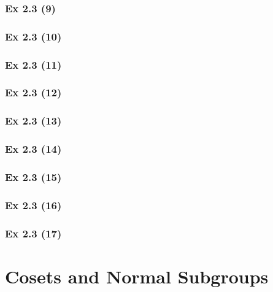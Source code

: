 \subsubsection{Ex 2.3 (9)}\label{sec:Ex_2.3.9}

\subsubsection{Ex 2.3 (10)}\label{sec:Ex_2.3.10}

\newpage		%

\subsubsection{Ex 2.3 (11)}\label{sec:Ex_2.3.11}

\subsubsection{Ex 2.3 (12)}\label{sec:Ex_2.3.12}

\subsubsection{Ex 2.3 (13)}\label{sec:Ex_2.3.13}

\subsubsection{Ex 2.3 (14)}\label{sec:Ex_2.3.14}

\subsubsection{Ex 2.3 (15)}\label{sec:Ex_2.3.15}

\subsubsection{Ex 2.3 (16)}\label{sec:Ex_2.3.16}

\subsubsection{Ex 2.3 (17)}\label{sec:Ex_2.3.17}

\newpage		%

\section{Cosets and Normal Subgroups}\label{sec:2.4}
